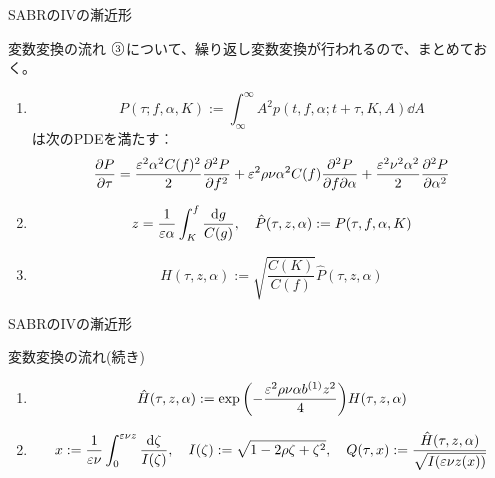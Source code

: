 \documentclass[dvipdfmx,9pt]{beamer}
\begin{document}
\begin{frame}{SABRのIVの漸近形}
  \begin{block}{変数変換の流れ}
    $\raise0.2ex\hbox{\textcircled{\scriptsize{3}}}$について、繰り返し変数変換が行われるので、まとめておく。
    \begin{enumerate}
      \item
            \begin{equation}
              P(\tau ; f,\alpha,K) := \int_{\infty}^{\infty} A^{2} p(t,f,\alpha ; t + \tau ,K,A) \dd A
            \end{equation}
            は次のPDEを満たす︰
            \begin{equation}
              \pdv{P}{\tau} = \frac{\varepsilon^{2}\alpha^{2}C(f)^{2}}{2}\pdv[2]{P}{f} + \varepsilon^{2} \rho \nu \alpha^{2} C(f) \pdv{P}{f}{\alpha} + \frac{\varepsilon^{2}\nu^{2}\alpha^{2}}{2}\pdv[2]{P}{\alpha}
            \end{equation}
      \item
            \begin{equation}
              z = \frac{1}{\varepsilon\alpha}\int^{f}_{K}\frac{\dd g}{C(g)} , \quad \hat{P}(\tau,z,\alpha) := P(\tau,f,\alpha,K)
            \end{equation}
      \item \begin{equation}
              H(\tau,z,\alpha) := \sqrt{\frac{C(K)}{C(f)}}\hat{P}(\tau,z,\alpha)
            \end{equation}
    \end{enumerate}
  \end{block}
\end{frame}

\begin{frame}{SABRのIVの漸近形}
  \begin{block}{変数変換の流れ(続き)}
    \begin{enumerate}
      \setcounter{enumi}{3}
      \item
            \begin{equation}
              \hat{H}(\tau,z,\alpha) := \expi{-\frac{\ep^{2}\rho\nu\alpha b^{(1)}z^{2}}{4}}H(\tau,z,\alpha)
            \end{equation}
      \item
            \begin{equation}
              x := \frac{1}{\varepsilon\nu}\int_{0}^{\varepsilon\nu z}\frac{\dd \zeta}{I(\zeta)}, \quad
              I(\zeta) := \sqrt{1 - 2\rho\zeta + \zeta^{2}}, \quad
              Q(\tau, x) := \frac{\hat{H}(\tau,z,\alpha)}{\sqrt{I(\varepsilon\nu z(x))}}
            \end{equation}
    \end{enumerate}
  \end{block}
\end{frame}
\end{document}
